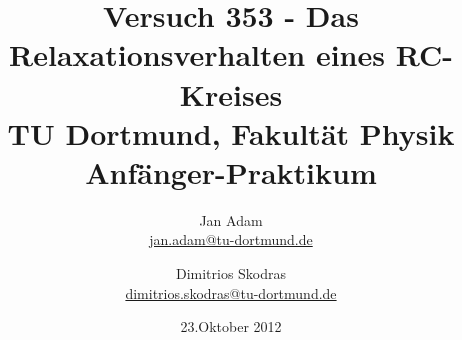 



\title{Versuch 353 - Das Relaxationsverhalten eines RC-Kreises\\				%
\large TU Dortmund, Fakultät Physik\\ 
\normalsize Anfänger-Praktikum}

\author{Jan Adam\\			%
{\small \href{jan.adam@tu-dortmund.de}{jan.adam@tu-dortmund.de}}	%
\and						%
Dimitrios Skodras\\					%
{\small \href{dimitrios.skodras@tu-dortmund.de}{dimitrios.skodras@tu-dortmund.de}}		%
}
\date{23.Oktober 2012}				%





\maketitle					%
\thispagestyle{empty} 				%



\tableofcontents


\newpage					%



